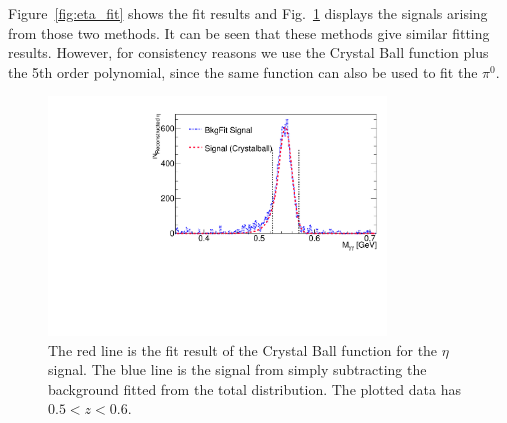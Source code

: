  Figure~\ref{fig:eta_fit} shows the fit results and Fig.~\ref{fig:etasignal} displays the signals arising from those two methods. It can be seen that these methods give similar fitting results. However, for consistency reasons we use the Crystal Ball function plus the 5th order polynomial, since the same function can also be used to fit the $\pi^0$.

\begin{figure}[H]
\centering
\includegraphics[width=0.8\textwidth,natwidth=610,natheight=642]{figure_dataselection/eta_Signal_Z_4.pdf}
\caption{The red line is the fit result of the Crystal Ball function for the $\eta$ signal. The blue line is the signal from simply subtracting the background fitted from the total distribution. The plotted data has $0.5<z<0.6$.}
\label{fig:etasignal}
\end{figure}

